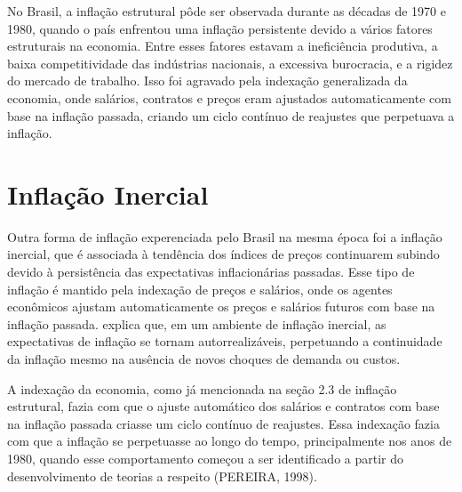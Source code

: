\documentclass[12pt,oneside,a4paper,chapter=TITLE,english,brazil,sumario=abnt-6027-2012]{abntex2}
\begin{document}
No Brasil, a inflação estrutural pôde ser observada durante as décadas de 1970 e 1980, quando o país enfrentou uma inflação persistente devido a vários fatores estruturais na economia. Entre esses fatores estavam a ineficiência produtiva, a baixa competitividade das indústrias nacionais, a excessiva burocracia, e a rigidez do mercado de trabalho. Isso foi agravado pela indexação generalizada da economia, onde salários, contratos e preços eram ajustados automaticamente com base na inflação passada, criando um ciclo contínuo de reajustes que perpetuava a inflação.

\section{Inflação Inercial}


Outra forma de inflação experenciada pelo Brasil na mesma época foi a inflação inercial, que é associada à tendência dos índices de preços continuarem subindo devido à persistência das expectativas inflacionárias passadas. Esse tipo de inflação é mantido pela indexação de preços e salários, onde os agentes econômicos ajustam automaticamente os preços e salários futuros com base na inflação passada.  explica que, em um ambiente de inflação inercial, as expectativas de inflação se tornam autorrealizáveis, perpetuando a continuidade da inflação mesmo na ausência de novos choques de demanda ou custos.

A indexação da economia, como já mencionada na seção 2.3 de inflação estrutural, fazia com que o ajuste automático dos salários e contratos com base na inflação passada criasse um ciclo contínuo de reajustes. Essa indexação fazia com que a inflação se perpetuasse ao longo do tempo, principalmente nos anos de 1980, quando esse comportamento começou a ser identificado a partir do desenvolvimento de teorias a respeito (PEREIRA, 1998).

\end{document}
